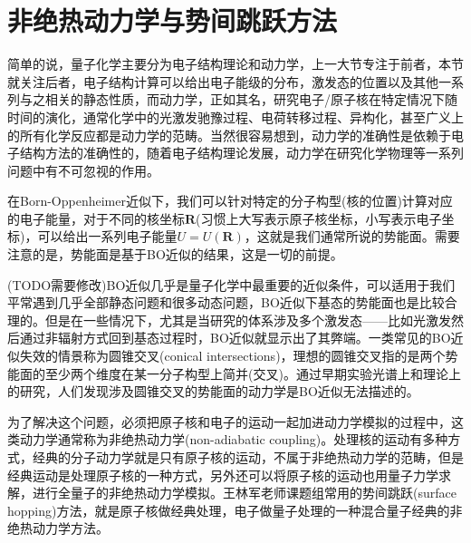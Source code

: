 \documentclass{article}
\numberwithin{equation}{section}
\begin{document}
    \section{非绝热动力学与势间跳跃方法}
    简单的说，量子化学主要分为电子结构理论和动力学，上一大节专注于前者，本节就关注后者，电子结构计算可以给出电子能级的分布，激发态的位置以及其他一系列与之相关的静态性质，而动力学，正如其名，研究电子/原子核在特定情况下随时间的演化，通常化学中的光激发驰豫过程、电荷转移过程、异构化，甚至广义上的所有化学反应都是动力学的范畴。当然很容易想到，动力学的准确性是依赖于电子结构方法的准确性的，随着电子结构理论发展，动力学在研究化学物理等一系列问题中有不可忽视的作用。

    在Born-Oppenheimer近似下，我们可以针对特定的分子构型(核的位置)计算对应的电子能量，对于不同的核坐标$\mathbf{R}$(习惯上大写表示原子核坐标，小写表示电子坐标)，可以给出一系列电子能量$U=U(\mathbf{R})$，这就是我们通常所说的势能面。需要注意的是，势能面是基于BO近似的结果，这是一切的前提。
    
    (TODO需要修改)BO近似几乎是量子化学中最重要的近似条件，可以适用于我们平常遇到几乎全部静态问题和很多动态问题，BO近似下基态的势能面也是比较合理的。但是在一些情况下，尤其是当研究的体系涉及多个激发态——比如光激发然后通过非辐射方式回到基态过程时，BO近似就显示出了其弊端。一类常见的BO近似失效的情景称为圆锥交叉(conical intersections)，理想的圆锥交叉指的是两个势能面的至少两个维度在某一分子构型上简并(交叉)。通过早期实验光谱上和理论上的研究，人们发现涉及圆锥交叉的势能面的动力学是BO近似无法描述的。
    
    为了解决这个问题，必须把原子核和电子的运动一起加进动力学模拟的过程中，这类动力学通常称为非绝热动力学(non-adiabatic coupling)。处理核的运动有多种方式，经典的分子动力学就是只有原子核的运动，不属于非绝热动力学的范畴，但是经典运动是处理原子核的一种方式，另外还可以将原子核的运动也用量子力学求解，进行全量子的非绝热动力学模拟。王林军老师课题组常用的势间跳跃(surface hopping)方法，就是原子核做经典处理，电子做量子处理的一种混合量子经典的非绝热动力学方法。
\end{document}

